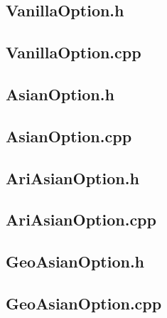 \documentclass[12pt]{article}
\begin{document}
\subsection{VanillaOption.h}

\subsection{VanillaOption.cpp}


\subsection{AsianOption.h}

\subsection{AsianOption.cpp}


\subsection{AriAsianOption.h}

\subsection{AriAsianOption.cpp}


\subsection{GeoAsianOption.h}

\subsection{GeoAsianOption.cpp}

\end{document}
